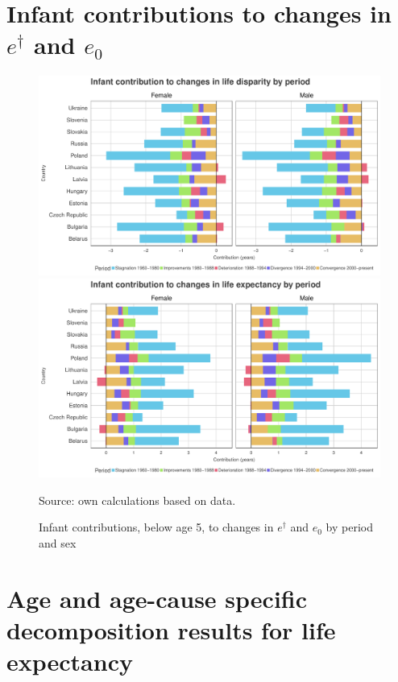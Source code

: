 \documentclass{article}
\begin{document}
\newpage



\section*{Infant contributions to changes in $e^\dagger$ and $e_0$}

\begin{figure}[h!]
\centering
\caption{Infant contributions, below age 5, to changes in $e^\dagger$ and $e_0$ by period and sex}
\label{Fig_LE&LD}
\begin{center}
\includegraphics[scale=.5]{Figures/Infant_ed_decomp.pdf}
\includegraphics[scale=.5]{Figures/Infant_ex_decomp.pdf}
\end{center}
Source: own calculations based on \citet{HMD} data. 
\end{figure}

\newpage

\section*{Age and age-cause specific decomposition results for life expectancy}
\end{document}
